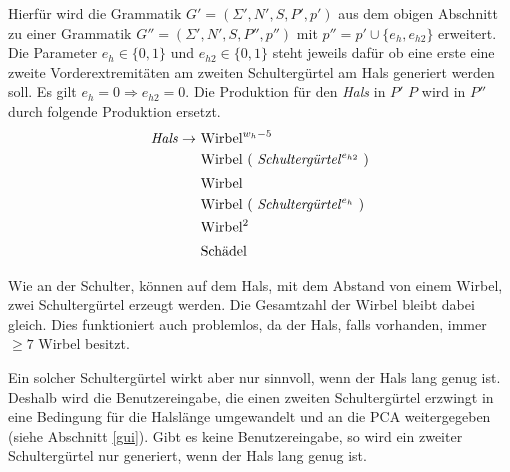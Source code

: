 Hierfür wird die Grammatik $G' = (\Sigma', N', S, P', p')$ aus dem obigen Abschnitt zu einer Grammatik \mbox{$G'' = (\Sigma', N', S, P'', p'')$} mit $p'' = p' \cup \{e_h, e_{h2}\}$ erweitert. Die Parameter $e_h \in \{0,1\}$ und $e_{h2} \in \{0, 1\}$ steht jeweils dafür ob eine erste \bzw eine zweite Vorderextremitäten am zweiten Schultergürtel am Hals generiert werden soll. Es gilt $e_h = 0 \Rightarrow e_{h2} = 0$.
Die Produktion für den \emph{Hals} in $P'$ \bzw $P$ wird in $P''$ durch folgende Produktion ersetzt.
\begin{align*}
 \text{\emph{Hals}} \rightarrow &\text{ Wirbel}^{w_h - 5}\\
    &\text{ Wirbel ( \emph{Schultergürtel}$^{e_{h2}}$ )}\\
    &\text{ Wirbel}^{\vphantom{(}}\\
    &\text{ Wirbel ( \emph{Schultergürtel}$^{e_h}$ )}\\
    &\text{ Wirbel$^2$}\\
    &\text{ Schädel}^{\vphantom{(}}
\end{align*}

Wie an der Schulter, können auf dem Hals, mit dem Abstand von einem Wirbel, zwei Schultergürtel erzeugt werden. Die Gesamtzahl der Wirbel bleibt dabei gleich.  Dies funktioniert auch problemlos, da der Hals, falls vorhanden, immer $\geq 7$ Wirbel besitzt.

Ein solcher Schultergürtel wirkt aber nur sinnvoll, wenn der Hals lang genug ist. Deshalb wird die Benutzereingabe, die einen zweiten Schultergürtel erzwingt in eine Bedingung für die Halslänge umgewandelt und an die PCA weitergegeben (siehe Abschnitt \ref{gui}). Gibt es keine Benutzereingabe, so wird ein zweiter Schultergürtel nur generiert, wenn der Hals lang genug ist.

